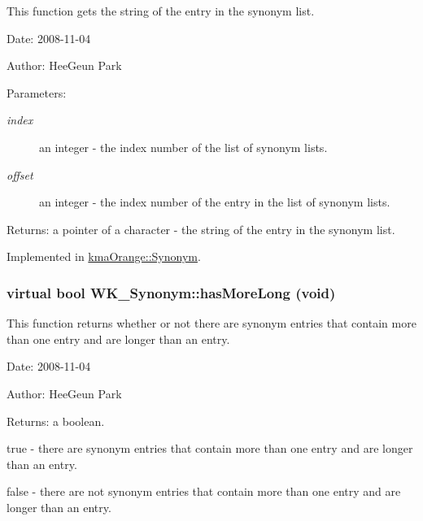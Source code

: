 This function gets the string of the entry in the synonym list. 

\begin{Desc}
\item[Date:]2008-11-04 \end{Desc}
\begin{Desc}
\item[Author:]HeeGeun Park \end{Desc}
\begin{Desc}
\item[Parameters:]
\begin{description}
\item[{\em index}]an integer - the index number of the list of synonym lists. \item[{\em offset}]an integer - the index number of the entry in the list of synonym lists. \end{description}
\end{Desc}
\begin{Desc}
\item[Returns:]a pointer of a character - the string of the entry in the synonym list. \end{Desc}


Implemented in \hyperlink{classkmaOrange_1_1Synonym_96f92eecdd58a5be11e411cbb6eeb087}{kmaOrange::Synonym}.\hypertarget{classWK__Synonym_71c1c134392af940e8e2a1e003c511cf}{
\subsubsection[{hasMoreLong}]{\setlength{\rightskip}{0pt plus 5cm}virtual bool WK\_\-Synonym::hasMoreLong (void)}}
\label{classWK__Synonym_71c1c134392af940e8e2a1e003c511cf}


This function returns whether or not there are synonym entries that contain more than one entry and are longer than an entry. 

\begin{Desc}
\item[Date:]2008-11-04 \end{Desc}
\begin{Desc}
\item[Author:]HeeGeun Park \end{Desc}
\begin{Desc}
\item[Returns:]a boolean.\par
 true - there are synonym entries that contain more than one entry and are longer than an entry.\par
 false - there are not synonym entries that contain more than one entry and are longer than an entry. \end{Desc}


